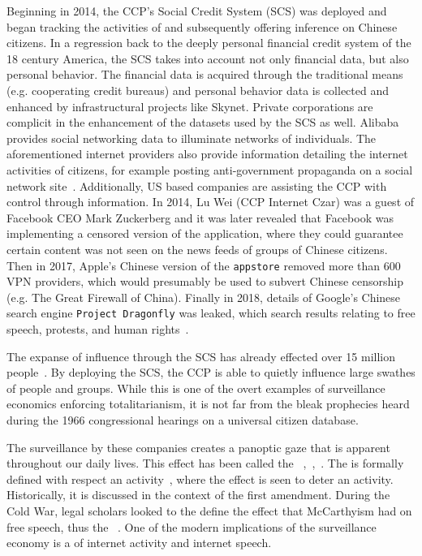 Beginning in 2014, the CCP's Social Credit System (SCS) was deployed and began
tracking the activities of and subsequently offering inference on Chinese
citizens. In a regression back to the deeply personal financial credit system
of the 18 century America, the SCS takes into account not only financial
data, but also personal behavior. The financial data is acquired through the
traditional means (e.g. cooperating credit bureaus) and personal behavior data
is collected and enhanced by infrastructural projects like Skynet. Private
corporations are complicit in the enhancement of the datasets used by the SCS
as well. Alibaba provides social networking data to illuminate networks of
individuals. The aforementioned internet providers also provide information
detailing the internet activities of citizens, for example posting
anti-government propaganda on a social network site~\cite{qiang2019road}.
Additionally, US based companies are assisting the CCP with control through
information. In 2014, Lu Wei (CCP Internet Czar) was a guest of Facebook CEO
Mark Zuckerberg and it was later revealed that Facebook was implementing a
censored version of the application, where they could guarantee certain content
was not seen on the news feeds of groups of Chinese citizens. Then in 2017,
Apple's Chinese version of the \texttt{appstore} removed more than 600 VPN
providers, which would presumably be used to subvert Chinese censorship (e.g.
The Great Firewall of China). Finally in 2018, details of Google's Chinese
search engine \texttt{Project Dragonfly} was leaked, which search results
relating to free speech, protests, and human rights~\cite{qiang2019road}.

The expanse of influence through the SCS has already effected over 15 million
people~\cite{qiang2019road}. By deploying the SCS, the CCP is able to quietly
influence large swathes of people and groups. While this is one of the overt
examples of surveillance economics enforcing totalitarianism, it is not far
from the bleak prophecies heard during the 1966 congressional hearings on a
universal citizen database.

The surveillance by these companies creates a panoptic gaze that is apparent
throughout our daily lives. This effect has been called the \ce
~\cite{schauer1978fear},~\cite{richards2012dangers},~\cite{penney2016chilling}. The \ce is formally
defined with respect an activity~\cite{schauer1978fear}, where the effect is
seen to deter an activity. Historically, it is discussed in the context of the
first amendment. During the Cold War, legal scholars looked to the define the
effect that McCarthyism had on free speech, thus the ~\ce. One of the modern
implications of the surveillance economy is a \ce of internet activity and
internet speech.

